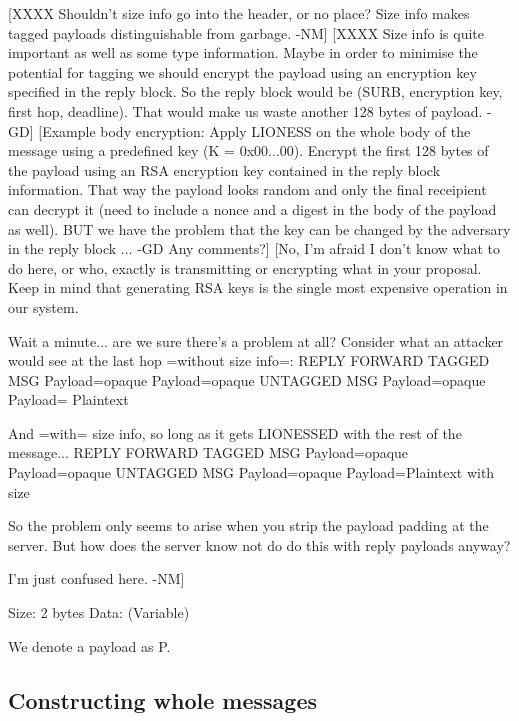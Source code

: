   [XXXX Shouldn't size info go into the header, or no place?  Size
     info makes tagged payloads distinguishable from garbage. -NM]
  [XXXX Size info is quite important as well as some type information.
     Maybe in order to minimise the potential for tagging we should
     encrypt the payload using an encryption key specified in the
     reply block. So the reply block would be (SURB, encryption key,
     first hop, deadline). That would make us waste another 128 bytes
     of payload. -GD]
  [Example body encryption: Apply LIONESS on the whole body of the
     message using a predefined key (K = 0x00...00). Encrypt the first
     128 bytes of the payload using an RSA encryption key contained in
     the reply block information. That way the payload looks random
     and only the final receipient can decrypt it (need to include a
     nonce and a digest in the body of the payload as well). BUT we
     have the problem that the key can be changed by the adversary in
     the reply block ... -GD Any comments?]
  [No, I'm afraid I don't know what to do here, or who, exactly is
     transmitting or encrypting what in your proposal.  Keep in mind 
     that generating RSA keys is the single most expensive operation
     in our system.
 
     Wait a minute... are we sure there's a problem at all?  Consider
     what an attacker would see at the last hop =without size info=:
                            REPLY          FORWARD 
          TAGGED MSG     Payload=opaque  Payload=opaque 
          UNTAGGED MSG   Payload=opaque  Payload= Plaintext 

     And =with= size info, so long as it gets LIONESSED with the
     rest of the message...
                            REPLY          FORWARD 
          TAGGED MSG     Payload=opaque  Payload=opaque 
          UNTAGGED MSG   Payload=opaque  Payload=Plaintext with size

     So the problem only seems to arise when you strip the payload
     padding at the server.  But how does the server know not do
     do this with reply payloads anyway?

     I'm just confused here. -NM]

Size:   2 bytes
Data:   (Variable)

We denote a payload as P.

\subsection{Constructing whole messages}

